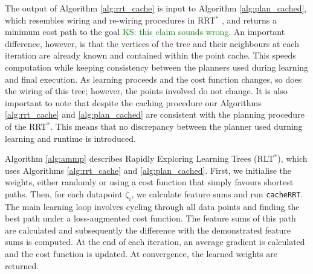 \documentclass{article}  %
\newcommand{\ks}[1]{\textcolor{green}{KS: #1}}
\begin{document}
The output of Algorithm \ref{alg:rrt_cache} is input to Algorithm \ref{alg:plan_cached}, which resembles wiring and re-wiring procedures in RRT$^*$ \cite{karaman2011sampling}, and returns a minimum cost path to the goal \ks{this claim sounds wrong}. An important difference, however, is that the vertices of the tree and their neighbours at each iteration are already known and contained within the point cache. This speeds computation while keeping consistency between the planners used during learning and final execution. As learning proceeds and the cost function changes, so does the wiring of this tree; however, the points involved do not change. It is also important to note that despite the caching procedure our Algorithms \ref{alg:rrt_cache} and \ref{alg:plan_cached} are consistent with the planning procedure of the RRT$^*$. This means that no discrepancy between the planner used durning learning and runtime is introduced.

Algorithm \ref{alg:ammp} describes Rapidly Exploring Learning Trees (RLT$^*$), which uses Algorithms \ref{alg:rrt_cache} and \ref{alg:plan_cached}. First, we initialise the weights, either randomly or using a cost function that simply favours shortest paths. Then, for each datapoint $\zeta_i$, we calculate feature sums and run \texttt{cacheRRT}. The main learning loop involves cycling through all data points and finding the best path under a loss-augmented cost function. The feature sums of this path are calculated and subsequently the difference with the demonstrated feature sums is computed. At the end of each iteration, an average gradient is calculated and the cost function is updated. At convergence, the learned weights are returned.
\end{document}
